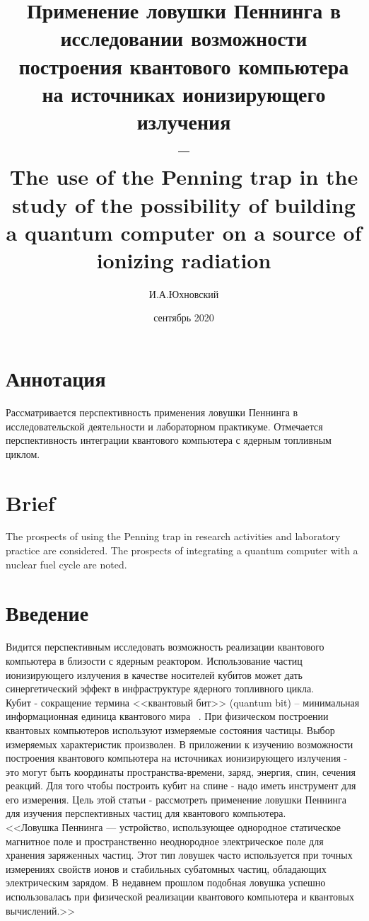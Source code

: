 \documentclass[11pt]{article}
\title{\textbf{Применение ловушки Пеннинга в исследовании возможности построения квантового компьютера на источниках ионизирующего излучения \\ -- \\ 
The use of the Penning trap in the study of the possibility of building a quantum computer on a source of ionizing radiation }}
\author{И.А.Юхновский}
\date{сентябрь 2020}
\begin{document}
\maketitle
\thispagestyle{empty}

\section*{Аннотация}
Рассматривается перспективность применения ловушки Пеннинга в исследовательской деятельности и лабораторном практикуме. Отмечается перспективность интеграции квантового компьютера с ядерным топливным циклом.

\section*{Brief}
The prospects of using the Penning trap in research activities and laboratory practice are considered. The prospects of integrating a quantum computer with a nuclear fuel cycle are noted.

\section{Введение}
Видится перспективным исследовать возможность реализации квантового компьютера в близости с ядерным реактором. Использование частиц ионизирующего излучения в качестве носителей кубитов может дать синергетический эффект в инфраструктуре ядерного топливного цикла.\\

Кубит - сокращение термина <<квантовый бит>> (quantum bit) -- минимальная информационная единица квантового мира ~\cite{Sysoev, Courcera_KvVich}. При физическом построении квантовых компьютеров используют измеряемые состояния частицы. Выбор измеряемых характеристик произволен. В приложении к изучению возможности построения квантового компьютера на источниках ионизирующего излучения - это могут быть координаты  пространства-времени, заряд, энергия, спин, сечения реакций. Для того чтобы построить кубит на спине - надо иметь инструмент для его измерения. Цель этой статьи - рассмотреть применение ловушки Пеннинга для изучения перспективных частиц для квантового компьютера. \\

 <<Ловушка Пеннинга — устройство, использующее однородное статическое магнитное поле и пространственно неоднородное электрическое поле для хранения заряженных частиц. Этот тип ловушек часто используется при точных измерениях свойств ионов и стабильных субатомных частиц, обладающих электрическим зарядом. В недавнем прошлом подобная ловушка успешно использовалась при физической реализации квантового компьютера и квантовых вычислений.>> ~\cite{wiki}
\end{document}
